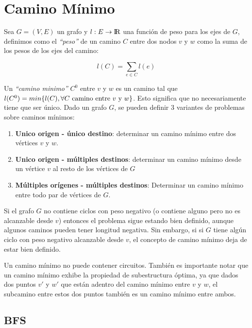 \newpage
\section{Camino M\'inimo}

Sea $G = (V, E)$ un grafo y $l: E \rightarrow {\rm I\!R}$ una funci\'on de peso para los ejes de $G$, definimos como el \emph{``peso''} de un camino $C$ entre dos nodos $v$ y $w$ como la suma de los pesos de los ejes del camino:

\begin{equation}
l(C) = \sum_{e \in C} l(e)
\end{equation}

Un \emph{``camino minimo''} $C^0$ entre $v$ y $w$ es un camino tal que $l(C^0) = min \{ l(C), \forall \textrm{$ C$ camino entre $v$ y $w$}  \}$. Esto significa que no necesariamente tiene que ser \'unico. Dado un grafo $G$, se pueden definir 3 variantes de problemas sobre caminos m\'inimos:

\begin{enumerate}
\item \textbf{Unico origen - \'unico destino}: determinar un camino m\'inimo entre dos v\'ertices $v$ y $w$.
\item \textbf{Unico origen - m\'ultiples destinos}: determinar un camino m\'inimo desde un v\'ertice $v$ al resto de los v\'ertices de $G$
\item \textbf{M\'ultiples or\'igenes - m\'ultiples destinos}: Determinar un camino m\'inimo entre todo par de v\'ertices de $G$.
\end{enumerate}

Si el grafo $G$ no contiene ciclos con peso negativo (o contiene alguno pero no es alcanzable desde $v$) entonces el problema sigue estando bien definido, aunque algunos caminos pueden tener longitud negativa. Sin embargo, si si $G$ tiene alg\'un ciclo con peso negativo alcanzable desde $v$, el concepto de camino m\'inimo deja de estar bien definido.

Un camino m\'inimo no puede contener circuitos. Tambi\'en es importante notar que un camino m\'inimo exhibe la propiedad de subestructura \'optima, ya que dados dos puntos $v'$ y $w'$ que est\'an adentro del camino m\'inimo entre $v$ y $w$, el subcamino entre estos dos puntos tambi\'en es un camino m\'inimo entre ambos.

\subsection{BFS}

